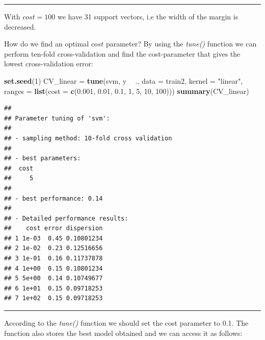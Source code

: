\documentclass[]{article}
\newenvironment{Shaded}{\begin{snugshade}}{\end{snugshade}}
\newcommand{\DataTypeTok}[1]{\textcolor[rgb]{0.13,0.29,0.53}{#1}}
\newcommand{\DecValTok}[1]{\textcolor[rgb]{0.00,0.00,0.81}{#1}}
\newcommand{\FloatTok}[1]{\textcolor[rgb]{0.00,0.00,0.81}{#1}}
\newcommand{\KeywordTok}[1]{\textcolor[rgb]{0.13,0.29,0.53}{\textbf{#1}}}
\newcommand{\NormalTok}[1]{#1}
\newcommand{\OperatorTok}[1]{\textcolor[rgb]{0.81,0.36,0.00}{\textbf{#1}}}
\newcommand{\StringTok}[1]{\textcolor[rgb]{0.31,0.60,0.02}{#1}}
\begin{document}
\normalsize

\begin{center}\rule{0.5\linewidth}{\linethickness}\end{center}

With \(cost=100\) we have 31 support vectors, i.e the width of the
margin is decreased.

How do we find an optimal \(cost\) parameter? By using the \emph{tune()}
function we can perform ten-fold cross-validation and find the
cost-parameter that gives the lowest cross-validation error:

\footnotesize

\begin{Shaded}
\begin{Highlighting}[]
\KeywordTok{set.seed}\NormalTok{(}\DecValTok{1}\NormalTok{)}
\NormalTok{CV_linear =}\StringTok{ }\KeywordTok{tune}\NormalTok{(svm, y }\OperatorTok{~}\StringTok{ }\NormalTok{., }\DataTypeTok{data =}\NormalTok{ train2, }\DataTypeTok{kernel =} \StringTok{"linear"}\NormalTok{, }\DataTypeTok{ranges =} \KeywordTok{list}\NormalTok{(}\DataTypeTok{cost =} \KeywordTok{c}\NormalTok{(}\FloatTok{0.001}\NormalTok{, }
    \FloatTok{0.01}\NormalTok{, }\FloatTok{0.1}\NormalTok{, }\DecValTok{1}\NormalTok{, }\DecValTok{5}\NormalTok{, }\DecValTok{10}\NormalTok{, }\DecValTok{100}\NormalTok{)))}
\KeywordTok{summary}\NormalTok{(CV_linear)}
\end{Highlighting}
\end{Shaded}

\begin{verbatim}
## 
## Parameter tuning of 'svm':
## 
## - sampling method: 10-fold cross validation 
## 
## - best parameters:
##  cost
##     5
## 
## - best performance: 0.14 
## 
## - Detailed performance results:
##    cost error dispersion
## 1 1e-03  0.45 0.10801234
## 2 1e-02  0.23 0.12516656
## 3 1e-01  0.16 0.11737878
## 4 1e+00  0.15 0.10801234
## 5 5e+00  0.14 0.10749677
## 6 1e+01  0.15 0.09718253
## 7 1e+02  0.15 0.09718253
\end{verbatim}

\normalsize

\begin{center}\rule{0.5\linewidth}{\linethickness}\end{center}

According to the \emph{tune()} function we should set the cost parameter
to 0.1. The function also stores the best model obtained and we can
access it as follows:

\begin{Shaded}
\end{Shaded}
\end{document}
